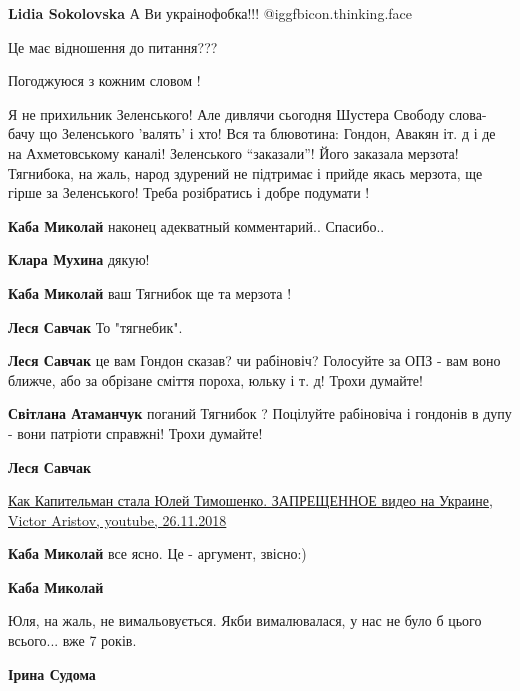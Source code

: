 \begin{itemize}
\begin{itemize}
\textbf{Lidia Sokolovska} А Ви украінофобка!!! @igg{fbicon.thinking.face} 

Це має відношення до питання???

\end{itemize} %

Погоджуюся з кожним словом !


Я не прихильник Зеленського! Але дивлячи сьогодня Шустера Свободу слова- бачу
що Зеленського 'валять' і хто! Вся та блювотина: Гондон, Авакян іт. д і де на
Ахметовському каналі! Зеленського \enquote{заказали}! Його заказала мерзота!
Тягнибока, на жаль, народ здурений не підтримає і прийде якась мерзота, ще
гірше за Зеленського! Треба розібратись і добре подумати !

\begin{itemize} %
\textbf{Каба Миколай} наконец адекватный комментарий.. Спасибо..

\textbf{Клара Мухина} дякую!

\textbf{Каба Миколай} ваш Тягнибок ще та мерзота !

\begin{itemize} %
\textbf{Леся Савчак} То "тягнебик".

\textbf{Леся Савчак} це вам Гондон сказав? чи рабіновіч? Голосуйте за ОПЗ - вам воно ближче, або за обрізане сміття пороха, юльку і т. д! Трохи думайте!

\textbf{Світлана Атаманчук} поганий Тягнибок ? Поцілуйте рабіновіча і гондонів в дупу - вони патріоти справжні! Трохи думайте!

\textbf{Леся Савчак} 

\href{https://youtu.be/SpzEzzarmlchttps://youtu.be/SpzEzzarmlc}{%
Как Капительман стала Юлей Тимошенко. ЗАПРЕЩЕННОЕ видео на Украине, %
Victor Aristov, youtube, 26.11.2018%
}

\textbf{Каба Миколай} все ясно. Це - аргумент, звісно:)

\end{itemize} %

\textbf{Каба Миколай} 

Юля, на жаль, не вимальовується. Якби вималювалася, у нас не було б цього
всього... вже 7 років.

\begin{itemize} %
\textbf{Ірина Судома}


\end{itemize}
\end{itemize}
\end{itemize}

